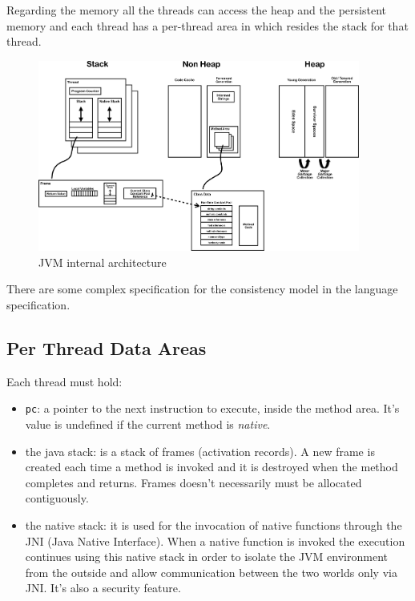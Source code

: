 Regarding the memory all the threads can access the heap and the persistent memory and each thread has a per-thread area in which resides the stack for that thread.

\begin{figure}[H]
    \centering
    \includegraphics[width=400px]{images/2_JVM/JVM_Internal_Architecture.png}
    \caption{JVM internal architecture}
\end{figure}
There are some complex specification for the consistency model in the language specification.

\subsection{Per Thread Data Areas}
Each thread must hold:
\begin{itemize}
    \item \verb|pc|: a pointer to the next instruction to execute, inside the method area.
    It's value is undefined if the current method is \emph{native}.
    
    \item the java stack: is a stack of frames (activation records).
    A new frame is created each time a method is invoked and it is destroyed when the method completes and returns.
    Frames doesn't necessarily must be allocated contiguously.
    
    \item the native stack: it is used for the invocation of native functions through the JNI (Java Native Interface).
    When a native function is invoked the execution continues using this native stack in order to isolate the JVM environment from the outside and allow communication between the two worlds only via JNI.
    It's also a security feature.
\end{itemize}

